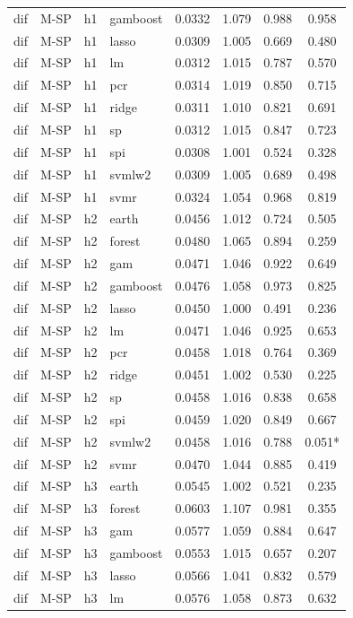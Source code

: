 \begin{ThreePartTable}
\begin{longtable}[t]{llclcccc}
dif & M-SP & h1 & gamboost & 0.0332 & 1.079 & 0.988 & 0.958\\
dif & M-SP & h1 & lasso & 0.0309 & 1.005 & 0.669 & 0.480\\
dif & M-SP & h1 & lm & 0.0312 & 1.015 & 0.787 & 0.570\\
dif & M-SP & h1 & pcr & 0.0314 & 1.019 & 0.850 & 0.715\\
dif & M-SP & h1 & ridge & 0.0311 & 1.010 & 0.821 & 0.691\\
dif & M-SP & h1 & sp & 0.0312 & 1.015 & 0.847 & 0.723\\
dif & M-SP & h1 & spi & 0.0308 & 1.001 & 0.524 & 0.328\\
dif & M-SP & h1 & svmlw2 & 0.0309 & 1.005 & 0.689 & 0.498\\
dif & M-SP & h1 & svmr & 0.0324 & 1.054 & 0.968 & 0.819\\
\addlinespace
dif & M-SP & h2 & earth & 0.0456 & 1.012 & 0.724 & 0.505\\
dif & M-SP & h2 & forest & 0.0480 & 1.065 & 0.894 & 0.259\\
dif & M-SP & h2 & gam & 0.0471 & 1.046 & 0.922 & 0.649\\
dif & M-SP & h2 & gamboost & 0.0476 & 1.058 & 0.973 & 0.825\\
dif & M-SP & h2 & lasso & 0.0450 & 1.000 & 0.491 & 0.236\\
dif & M-SP & h2 & lm & 0.0471 & 1.046 & 0.925 & 0.653\\
dif & M-SP & h2 & pcr & 0.0458 & 1.018 & 0.764 & 0.369\\
dif & M-SP & h2 & ridge & 0.0451 & 1.002 & 0.530 & 0.225\\
dif & M-SP & h2 & sp & 0.0458 & 1.016 & 0.838 & 0.658\\
dif & M-SP & h2 & spi & 0.0459 & 1.020 & 0.849 & 0.667\\
dif & M-SP & h2 & svmlw2 & 0.0458 & 1.016 & 0.788 & 0.051*\\
dif & M-SP & h2 & svmr & 0.0470 & 1.044 & 0.885 & 0.419\\
\addlinespace
dif & M-SP & h3 & earth & 0.0545 & 1.002 & 0.521 & 0.235\\
dif & M-SP & h3 & forest & 0.0603 & 1.107 & 0.981 & 0.355\\
dif & M-SP & h3 & gam & 0.0577 & 1.059 & 0.884 & 0.647\\
dif & M-SP & h3 & gamboost & 0.0553 & 1.015 & 0.657 & 0.207\\
dif & M-SP & h3 & lasso & 0.0566 & 1.041 & 0.832 & 0.579\\
dif & M-SP & h3 & lm & 0.0576 & 1.058 & 0.873 & 0.632\\

\end{longtable}
\end{ThreePartTable}

